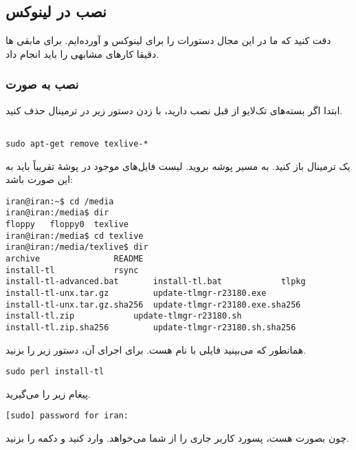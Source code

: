 \subsection{نصب در لینوکس}
دقت کنید که ما در این مجال دستورات را برای لینوکس  و  آورده‌ایم. برای مابقی  ها دقیقا کارهای مشابهی را باید انجام داد. 
\subsubsection{نصب به صورت }
ابتدا اگر بسته‌های تک‌لایو از قبل نصب دارید، با زدن دستور زیر در ترمینال حذف کنید.
\begin{latin}
\begin{lstlisting}[style=Mybash]‫
sudo apt-get remove texlive-*
\end{lstlisting}
\end{latin}

یک ترمینال باز کنید. به مسیر پوشه  بروید. لیست فایل‌های موجود در پوشهٔ 
 تقریباً باید به این صورت باشد:
\begin{latin}
\begin{lstlisting}[style=Mybash]
iran@iran:~$ cd /media
iran@iran:/media$ dir
floppy   floppy0  texlive
iran@iran:/media$ cd texlive
iran@iran:/media/texlive$ dir
archive               README
install-tl            rsync
install-tl-advanced.bat       install-tl.bat            tlpkg
install-tl-unx.tar.gz         update-tlmgr-r23180.exe
install-tl-unx.tar.gz.sha256  update-tlmgr-r23180.exe.sha256
install-tl.zip            update-tlmgr-r23180.sh
install-tl.zip.sha256         update-tlmgr-r23180.sh.sha256
\end{lstlisting}
\end{latin}
همانطور که می‌بینید فایلی با نام  هست. برای اجرای آن، دستور زیر را بزنید.
\begin{latin}
\begin{lstlisting}[style=Mybash]
sudo perl install-tl
\end{lstlisting}
\end{latin}
پیغام زیر را می‌گیرید.
\begin{latin}
\begin{lstlisting}[style=Mybash]
[sudo] password for iran:
\end{lstlisting}
\end{latin}
چون بصورت  هست، پسورد کاربر جاری را از شما می‌خواهد. وارد کنید و دکمه  را بزنید.


